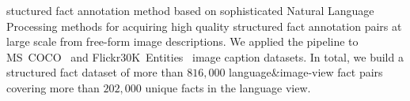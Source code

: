 \documentclass[runningheads]{llncs}
\begin{document}
stuctured fact annotation method based on sophisticated Natural Language Processing methods for acquiring high quality structured fact annotation pairs at large scale from free-form image descriptions. We applied the pipeline to MS~COCO~\cite{lin2014microsoft} and Flickr30K~Entities~\cite{plummer2015flickr30k,young2014image} image caption datasets. In total, we build a structured fact dataset of more than $816,000$ language\&image-view fact pairs covering more than $202,000$ unique facts in the language view. %
\end{document}
